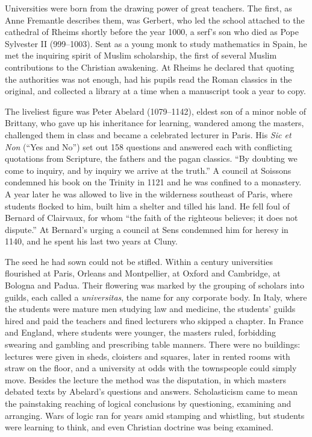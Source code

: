 Universities were born from the drawing power of great teachers. The first, as Anne Fremantle
describes them, was Gerbert, who led the school attached to the cathedral of Rheims shortly before the year 1000, a
serf's son who died as Pope Sylvester II (999--1003). Sent as a young monk to study mathematics in
Spain, he met the inquiring spirit of Muslim scholarship, the first of several Muslim contributions to
the Christian awakening. At Rheims he declared that quoting the authorities was not enough, had his
pupils read the Roman classics in the original, and collected a library at a time when a manuscript
took a year to copy.

The liveliest figure was Peter Abelard (1079--1142), eldest son of a minor noble of Brittany, who gave
up his inheritance for learning, wandered among the masters, challenged them in class and became a
celebrated lecturer in Paris. His \emph{Sic et Non} (``Yes and No'') set out 158 questions and
answered each with conflicting quotations from Scripture, the fathers and the pagan classics. ``By
doubting we come to inquiry, and by inquiry we arrive at the truth.'' A council at Soissons condemned
his book on the Trinity in 1121 and he was confined to a monastery. A year later he was allowed to
live in the wilderness southeast of Paris, where students flocked to him, built him a shelter and
tilled his land. He fell foul of Bernard of Clairvaux, for whom ``the faith of the righteous
believes; it does not dispute.'' At Bernard's urging a council at Sens condemned him for heresy in
1140, and he spent his last two years at Cluny.

The seed he had sown could not be stifled. Within a century universities flourished at Paris,
Orleans and Montpellier, at Oxford and Cambridge, at Bologna and Padua. Their flowering was marked by
the grouping of scholars into guilds, each called a \emph{universitas}, the name for any corporate
body. In Italy, where the students were mature men studying law and medicine, the students' guilds
hired and paid the teachers and fined lecturers who skipped a chapter. In France and England, where
students were younger, the masters ruled, forbidding swearing and gambling and prescribing table
manners. There were no buildings: lectures were given in sheds, cloisters and squares, later in rented
rooms with straw on the floor, and a university at odds with the townspeople could simply move.
Besides the lecture the method was the disputation, in which masters debated texts by Abelard's
questions and answers. Scholasticism came to mean the painstaking reaching of logical conclusions by
questioning, examining and arranging. Wars of logic ran for years amid stamping and whistling, but
students were learning to think, and even Christian doctrine was being examined.

